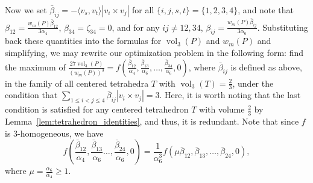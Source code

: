 \documentclass[twoside]{amsart}
\theoremstyle{definition}
\DeclareMathOperator{\vol}{vol}
\begin{document}
Now we set $\bar{\beta}_{ij} = - \langle v_s, v_t \rangle |v_i \times v_j|$ for all $\{ i,j,s,t \} = \{ 1,2,3,4\}$, and note that
$\beta_{12}= \frac{w_m(P) \bar{\beta}_{12}}{3\alpha_4}$, $\beta_{34}= \zeta_{34}=0$, and for any $ij \neq 12, 34$, $\beta_{ij}= \frac{w_m(P) \bar{\beta}_{ij}}{3\alpha_6}$.
Substituting back these quantities into the formulas for $\vol_3(P)$ and $w_m(P)$ and simplifying, we may rewrite our optimization problem in the following form:
find the maximum of $\frac{27 \vol_3(P)}{\left(w_m(P) \right)^3} = f\left(\frac{\bar{\beta}_{12}}{\alpha_4}, \frac{\bar{\beta}_{13}}{\alpha_6}, \ldots, \frac{\bar{\beta}_{34}}{\alpha_6}, 0 \right)$, where $\bar{\beta}_{ij}$ is defined as above, in the family of all centered tetrahedra $T$ with $\vol_3(T)=\frac{2}{3}$, under the condition that $\sum_{1 \leq i < j \leq 4} \bar{\beta}_{ij} |v_i \times v_j| = 3$. Here, it is worth noting that the last condition is satisfied for any centered tetrahedron $T$ with volume $\frac{2}{3}$ by Lemma~\ref{lem:tetrahedron_identities}, and thus, it is redundant.
Note that since $f$ is $3$-homogeneous, we have
\[
f\left(\frac{\bar{\beta}_{12}}{\alpha_4}, \frac{\bar{\beta}_{13}}{\alpha_6} \ldots, \frac{\bar{\beta}_{24}}{\alpha_6}, 0 \right) =
\frac{1}{\alpha_6^3} f\left(\mu \bar{\beta}_{12}, \bar{\beta}_{13}, \ldots, \bar{\beta}_{24}, 0 \right),
\]
where $\mu = \frac{\alpha_6}{\alpha_4} \geq 1$.
\end{document}
